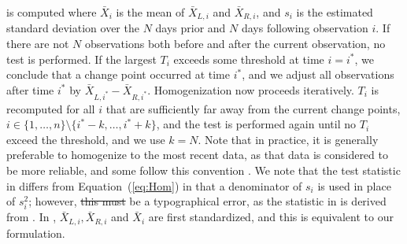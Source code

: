 \documentclass[12pt]{article}
\def\ni{\noindent}
\providecommand{\DIFaddtex}[1]{{\protect\color{blue}\uwave{#1}}} %
\providecommand{\DIFdeltex}[1]{{\protect\color{red}\sout{#1}}}                      %
\providecommand{\DIFaddbegin}{} %
\providecommand{\DIFaddend}{} %
\providecommand{\DIFdelbegin}{} %
\providecommand{\DIFdelend}{} %
\providecommand{\DIFadd}[1]{\texorpdfstring{\DIFaddtex{#1}}{#1}} %
\providecommand{\DIFdel}[1]{\texorpdfstring{\DIFdeltex{#1}}{}} %
\begin{document}
\begin{doublespacing}
\ni is computed where $\bar{X}_i$ is the mean of $\bar{X}_{L,i}$ and $\bar{X}_{R,i}$, and $s_i$ is the estimated standard deviation over the $N$ days prior and $N$ days following observation $i$.  If there are not $N$ observations both before and after the current observation, no test is performed.  If the largest $T_i$ exceeds some threshold at time $i=i^*$, we conclude that a change point occurred at time $i^*$, and we adjust all observations after time $i^*$ by $\bar{X}_{L,i^*}-\bar{X}_{R,i^*}$.  Homogenization now proceeds iteratively.  $T_i$ is recomputed for all $i$ that are sufficiently far away from the current change points, $i\in\{1,\ldots,n\} \setminus \{i^*-k, \ldots, i^*+k\}$, and the test is performed again until no $T_i$ exceed the threshold, and we use $k=N$.  Note that in practice, it is generally preferable to homogenize to the most recent data, as that data is considered to be more reliable, and some follow this convention \cite{domonkos13}. %
We note that the test statistic in \cite{haimberger07} differs from Equation~(\ref{eq:Hom}) in that a denominator of $s_i$ is used in place of $s_i^2$; however, \DIFdelbegin \DIFdel{this must  }\DIFdelend \DIFaddbegin \DIFadd{we believe this to }\DIFaddend be a typographical error, as the statistic in \cite{haimberger07} is derived from \cite{alexandersson86}.  In \cite{alexandersson86}, $\bar{X}_{L,i}, \bar{X}_{R,i}$ and $\bar{X}_{i}$ are first standardized, and  this is equivalent to our formulation.



\end{doublespacing}
\end{document}

